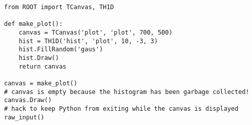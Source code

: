 \begin{footnotesize}
\begin{verbatim}
from ROOT import TCanvas, TH1D

def make_plot():
    canvas = TCanvas('plot', 'plot', 700, 500)
    hist = TH1D('hist', 'plot', 10, -3, 3)
    hist.FillRandom('gaus')
    hist.Draw()
    return canvas

canvas = make_plot()
# canvas is empty because the histogram has been garbage collected!
canvas.Draw()
# hack to keep Python from exiting while the canvas is displayed
raw_input()
\end{verbatim}
\end{footnotesize}
